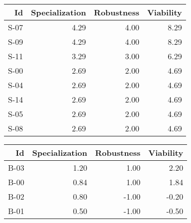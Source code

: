 


\begin{tabular}{ | r | r | r | r | }
    \hline
                    Id  &  Specialization  &      Robustness  &       Viability  \\
    \hline
    \hline
                  S-07  &            4.29  &            4.00  &            8.29  \\
    \hline
                  S-09  &            4.29  &            4.00  &            8.29  \\
    \hline
                  S-11  &            3.29  &            3.00  &            6.29  \\
    \hline
                  S-00  &            2.69  &            2.00  &            4.69  \\
    \hline
                  S-04  &            2.69  &            2.00  &            4.69  \\
    \hline
                  S-14  &            2.69  &            2.00  &            4.69  \\
    \hline
                  S-05  &            2.69  &            2.00  &            4.69  \\
    \hline
                  S-08  &            2.69  &            2.00  &            4.69  \\
    \hline
\end{tabular}


\begin{tabular}{ | r | r | r | r | }
    \hline
                    Id  &  Specialization  &      Robustness  &       Viability  \\
    \hline
    \hline
                  B-03  &            1.20  &            1.00  &            2.20  \\
    \hline
                  B-00  &            0.84  &            1.00  &            1.84  \\
    \hline
                  B-02  &            0.80  &           -1.00  &           -0.20  \\
    \hline
                  B-01  &            0.50  &           -1.00  &           -0.50  \\
    \hline
\end{tabular}


